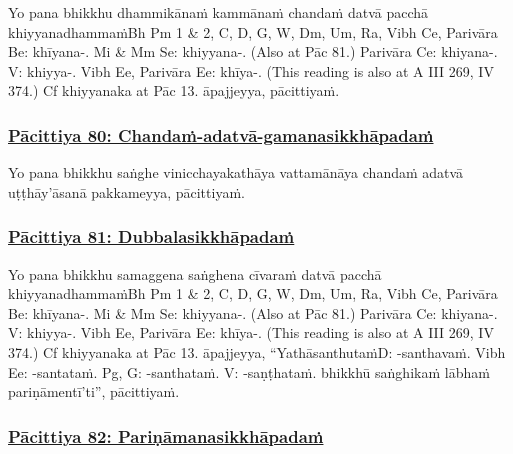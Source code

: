 Yo pana bhikkhu dhammikānaṁ kammānaṁ chandaṁ datvā pacchā khiyyanadhammaṁ\makeatletter\hyperlink{endnote-appendix}\makeatother Bh Pm 1 & 2, C, D, G, W, Dm, Um, Ra, Vibh Ce, Parivāra Be: khīyana-. Mi & Mm Se: khiyyana-. (Also at Pāc 81.) Parivāra Ce:
khiyana-. V: khiyya-. Vibh Ee, Parivāra Ee: khīya-. (This reading is also at A III 269, IV 374.) Cf khiyyanaka at Pāc 13. āpajjeyya, pācittiyaṁ.



\subsubsection*{\hyperref[exp80]{Pācittiya 80: Chandaṁ-adatvā-gamanasikkhāpadaṁ}}
\label{pac80}

Yo pana bhikkhu saṅghe vinicchayakathāya vattamānāya chandaṁ adatvā uṭṭhāy'āsanā pakkameyya, pācittiyaṁ.



\subsubsection*{\hyperref[exp81]{Pācittiya 81: Dubbalasikkhāpadaṁ}}
\label{pac81}

Yo pana bhikkhu samaggena saṅghena cīvaraṁ datvā pacchā khiyyanadhammaṁ\makeatletter\hyperlink{endnote-appendix}\makeatother Bh Pm 1 & 2, C, D, G, W, Dm, Um, Ra, Vibh Ce, Parivāra Be: khīyana-. Mi & Mm Se: khiyyana-. (Also at Pāc 81.) Parivāra Ce:
khiyana-. V: khiyya-. Vibh Ee, Parivāra Ee: khīya-. (This reading is also at A III 269, IV 374.) Cf khiyyanaka at Pāc 13. āpajjeyya, ``Yathāsanthutaṁ\makeatletter\hyperlink{endnote-appendix}\makeatother D: -santhavaṁ. Vibh Ee: -santataṁ. Pg, G: -santhataṁ. V: -saṇṭhataṁ. bhikkhū saṅghikaṁ lābhaṁ pariṇāmentī'ti'', pācittiyaṁ.



\subsubsection*{\hyperref[exp82]{Pācittiya 82: Pariṇāmanasikkhāpadaṁ}}
\label{pac82}

